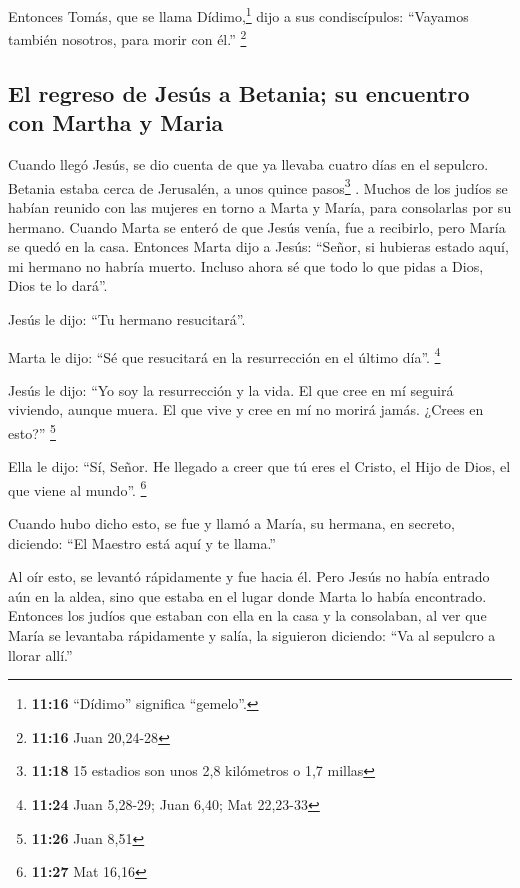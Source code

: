  Entonces Tomás, que se llama Dídimo,\footnote{\textbf{11:16}
  ``Dídimo'' significa ``gemelo''.} dijo a sus condiscípulos: ``Vayamos
también nosotros, para morir con él.'' \footnote{\textbf{11:16} Juan
  20,24-28}

\hypertarget{el-regreso-de-jesuxfas-a-betania-su-encuentro-con-martha-y-maria}{%
\subsection{El regreso de Jesús a Betania; su encuentro con Martha y
Maria}\label{el-regreso-de-jesuxfas-a-betania-su-encuentro-con-martha-y-maria}}

 Cuando llegó Jesús, se dio cuenta de que ya llevaba
cuatro días en el sepulcro.  Betania estaba cerca de
Jerusalén, a unos quince pasos\footnote{\textbf{11:18} 15 estadios son
  unos 2,8 kilómetros o 1,7 millas} .  Muchos de los
judíos se habían reunido con las mujeres en torno a Marta y María, para
consolarlas por su hermano.  Cuando Marta se enteró de
que Jesús venía, fue a recibirlo, pero María se quedó en la casa.
 Entonces Marta dijo a Jesús: ``Señor, si hubieras estado
aquí, mi hermano no habría muerto.  Incluso ahora sé que
todo lo que pidas a Dios, Dios te lo dará''.

 Jesús le dijo: ``Tu hermano resucitará''.

 Marta le dijo: ``Sé que resucitará en la resurrección en
el último día''. \footnote{\textbf{11:24} Juan 5,28-29; Juan 6,40; Mat
  22,23-33}

 Jesús le dijo: ``Yo soy la resurrección y la vida. El
que cree en mí seguirá viviendo, aunque muera.  El que
vive y cree en mí no morirá jamás. ¿Crees en esto?'' \footnote{\textbf{11:26}
  Juan 8,51}

 Ella le dijo: ``Sí, Señor. He llegado a creer que tú
eres el Cristo, el Hijo de Dios, el que viene al mundo''. \footnote{\textbf{11:27}
  Mat 16,16}

 Cuando hubo dicho esto, se fue y llamó a María, su
hermana, en secreto, diciendo: ``El Maestro está aquí y te llama.''

 Al oír esto, se levantó rápidamente y fue hacia él.
 Pero Jesús no había entrado aún en la aldea, sino que
estaba en el lugar donde Marta lo había encontrado. 
Entonces los judíos que estaban con ella en la casa y la consolaban, al
ver que María se levantaba rápidamente y salía, la siguieron diciendo:
``Va al sepulcro a llorar allí.''

